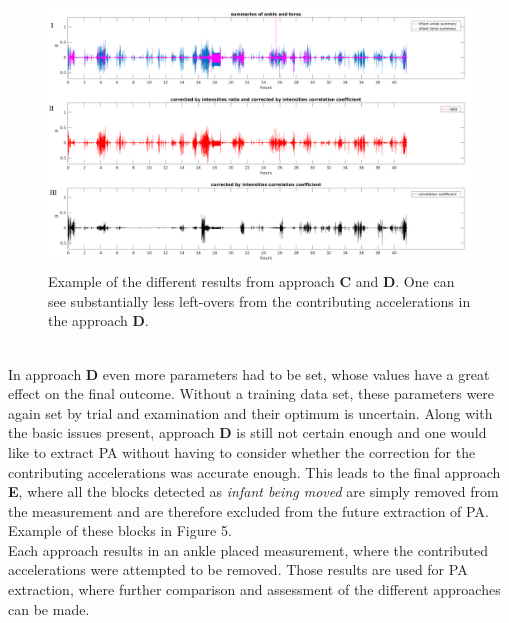 \documentclass{article}
\begin{document}
{\begin{figure}[h]
\includegraphics[width=15cm, height=7cm]{CorrectedIntensitiesCorrelation_result.png}
\caption{Example of the different results from approach \textbf{C} and \textbf{D}. One can see substantially less left-overs from the contributing accelerations in the approach \textbf{D}.}
\end{figure}
\\
In approach \textbf{D} even more parameters had to be set, whose values have a great effect on the final outcome. Without a training data set, these parameters were again set by trial and examination and their optimum is uncertain.
Along with the basic issues present, approach \textbf{D} is still not certain enough and one would like to extract PA without having to consider whether the correction for the contributing accelerations was accurate enough. This leads to the final approach \textbf{E}, where all the blocks detected as \textit{infant being moved} are simply removed from the measurement and are therefore excluded from the future extraction of PA. Example of these blocks in Figure 5.
\\Each approach results in an ankle placed measurement, where the contributed accelerations were attempted to be removed. Those results are used for PA extraction, where further comparison and assessment of the different approaches can be made.
}

\end{document}
